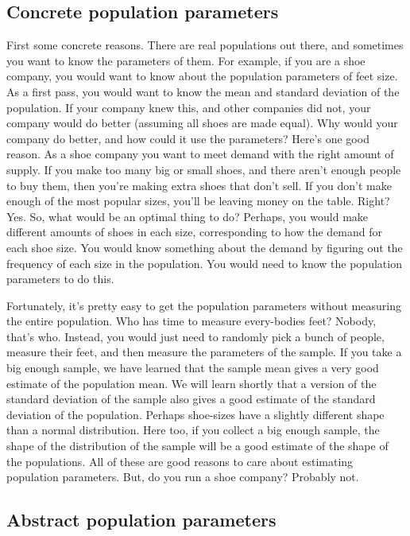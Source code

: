 \documentclass[
  letterpaper,
  DIV=11,
  numbers=noendperiod]{scrreprt}
\begin{document}
\subsection{Concrete population
parameters}\label{concrete-population-parameters}

First some concrete reasons. There are real populations out there, and
sometimes you want to know the parameters of them. For example, if you
are a shoe company, you would want to know about the population
parameters of feet size. As a first pass, you would want to know the
mean and standard deviation of the population. If your company knew
this, and other companies did not, your company would do better
(assuming all shoes are made equal). Why would your company do better,
and how could it use the parameters? Here's one good reason. As a shoe
company you want to meet demand with the right amount of supply. If you
make too many big or small shoes, and there aren't enough people to buy
them, then you're making extra shoes that don't sell. If you don't make
enough of the most popular sizes, you'll be leaving money on the table.
Right? Yes. So, what would be an optimal thing to do? Perhaps, you would
make different amounts of shoes in each size, corresponding to how the
demand for each shoe size. You would know something about the demand by
figuring out the frequency of each size in the population. You would
need to know the population parameters to do this.

Fortunately, it's pretty easy to get the population parameters without
measuring the entire population. Who has time to measure every-bodies
feet? Nobody, that's who. Instead, you would just need to randomly pick
a bunch of people, measure their feet, and then measure the parameters
of the sample. If you take a big enough sample, we have learned that the
sample mean gives a very good estimate of the population mean. We will
learn shortly that a version of the standard deviation of the sample
also gives a good estimate of the standard deviation of the population.
Perhaps shoe-sizes have a slightly different shape than a normal
distribution. Here too, if you collect a big enough sample, the shape of
the distribution of the sample will be a good estimate of the shape of
the populations. All of these are good reasons to care about estimating
population parameters. But, do you run a shoe company? Probably not.

\subsection{Abstract population
parameters}\label{abstract-population-parameters}
\end{document}
